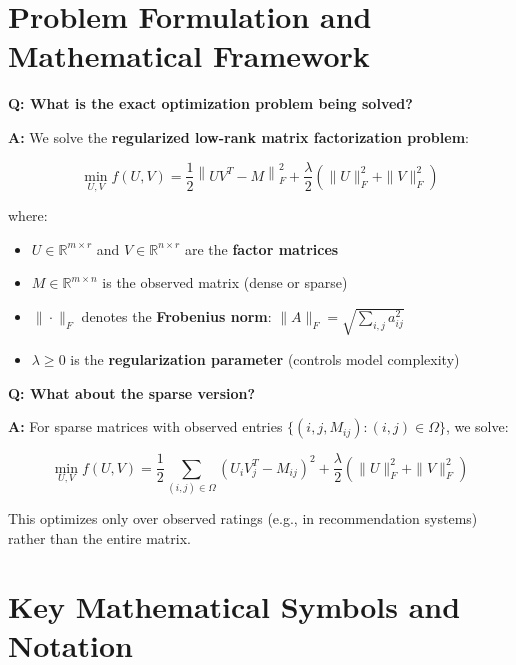 \documentclass[11pt,oneside]{article}
\newcommand{\defn}[1]{\textbf{#1}}
\newcommand{\Real}{\mathbb{R}}
\newcommand{\question}[1]{\textbf{Q: #1}}
\newcommand{\answer}{\textbf{A: }}
\begin{document}
\section{Problem Formulation and Mathematical Framework}\label{sec:formulation}

\question{What is the exact optimization problem being solved?}

\answer We solve the \defn{regularized low-rank matrix factorization problem}:

\begin{equation}\label{eq:objective}
    \min_{U, V} f(U, V) = \frac{1}{2}\left\|UV^T - M\right\|_F^2 + \frac{\lambda}{2}\left(\|U\|_F^2 + \|V\|_F^2\right)
\end{equation}

where:
\begin{itemize}
    \item $U \in \Real^{m \times r}$ and $V \in \Real^{n \times r}$ are the \defn{factor matrices}
    \item $M \in \Real^{m \times n}$ is the observed matrix (dense or sparse)
    \item $\|\cdot\|_F$ denotes the \defn{Frobenius norm}: $\|A\|_F = \sqrt{\sum_{i,j} a_{ij}^2}$
    \item $\lambda \geq 0$ is the \defn{regularization parameter} (controls model complexity)
\end{itemize}

\medskip

\question{What about the sparse version?}

\answer For sparse matrices with observed entries $\{(i, j, M_{ij}) : (i,j) \in \Omega\}$, we solve:

\begin{equation}\label{eq:sparse_objective}
    \min_{U, V} f(U, V) = \frac{1}{2}\sum_{(i,j) \in \Omega}(U_i V_j^T - M_{ij})^2 + \frac{\lambda}{2}\left(\|U\|_F^2 + \|V\|_F^2\right)
\end{equation}

This optimizes only over observed ratings (e.g., in recommendation systems) rather than the entire matrix.

\section{Key Mathematical Symbols and Notation}\label{sec:notation}
\end{document}
